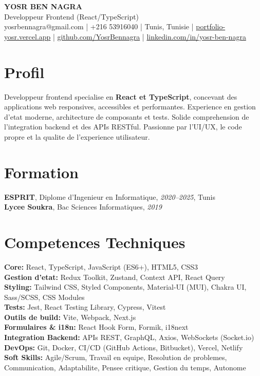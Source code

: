 \documentclass[10pt,a4paper]{article}
\begin{document}
\begin{center}
  {\Large\bfseries YOSR BEN NAGRA}\\[2pt]
  {\small Developpeur Frontend (React/TypeScript)}\\[3pt]
  {\footnotesize yosrbennagra@gmail.com \;|\; +216 53916040 \;|\; Tunis, Tunisie \;|\; \href{https://portfolio-yosr.vercel.app/fr}{portfolio-yosr.vercel.app} \;|\; \href{https://github.com/YosrBennagra}{github.com/YosrBennagra} \;|\; \href{https://www.linkedin.com/in/yosr-ben-nagra/}{linkedin.com/in/yosr-ben-nagra}}
\end{center}

\section*{Profil}
{\small
Developpeur frontend specialise en \textbf{React et TypeScript}, concevant des applications web responsives, accessibles et performantes. Experience en gestion d'etat moderne, architecture de composants et tests. Solide comprehension de l'integration backend et des APIs RESTful. Passionne par l'UI/UX, le code propre et la qualite de l'experience utilisateur.
}

\vspace{4pt}

\section*{Formation}
{\small
\textbf{ESPRIT}, Diplome d'Ingenieur en Informatique, \textit{2020--2025}, Tunis\\[1pt]
\textbf{Lycee Soukra}, Bac Sciences Informatiques, \textit{2019}
}

\vspace{4pt}

\section*{Competences Techniques}
{\small
\textbf{Core:} React, TypeScript, JavaScript (ES6+), HTML5, CSS3\\[2pt]
\textbf{Gestion d'etat:} Redux Toolkit, Zustand, Context API, React Query\\[2pt]
\textbf{Styling:} Tailwind CSS, Styled Components, Material-UI (MUI), Chakra UI, Sass/SCSS, CSS Modules\\[2pt]
\textbf{Tests:} Jest, React Testing Library, Cypress, Vitest\\[2pt]
\textbf{Outils de build:} Vite, Webpack, Next.js\\[2pt]
\textbf{Formulaires \& i18n:} React Hook Form, Formik, i18next\\[2pt]
\textbf{Integration Backend:} APIs REST, GraphQL, Axios, WebSockets (Socket.io)\\[2pt]
\textbf{DevOps:} Git, Docker, CI/CD (GitHub Actions, Bitbucket), Vercel, Netlify\\[2pt]
\textbf{Soft Skills:} Agile/Scrum, Travail en equipe, Resolution de problemes, Communication, Adaptabilite, Pensee critique, Gestion du temps, Autonome
}
\end{document}
